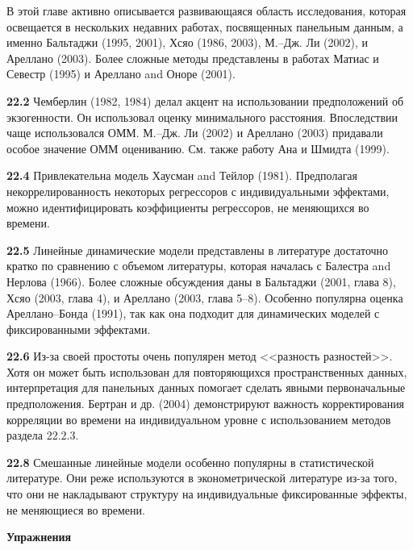 В этой главе активно описывается развивающаяся область исследования, которая освещается в нескольких недавних работах, посвященных панельным данным, а именно Бальтаджи (1995, 2001), Хсяо (1986, 2003), М.–Дж. Ли (2002), и Ареллано (2003). Более сложные методы представлены в работах Матиас и Севестр (1995) и Ареллано and Оноре (2001).

\textbf{22.2} Чемберлин (1982, 1984) делал акцент на использовании предположений об экзогенности. Он использовал оценку минимального расстояния. Впоследствии чаще использовался ОММ. М.–Дж. Ли (2002) и Ареллано (2003) придавали особое значение ОММ оцениванию. См. также работу Ана и Шмидта (1999).

\textbf{22.4} Привлекательна модель Хаусман and Тейлор (1981). Предполагая некоррелированность некоторых регрессоров с индивидуальными эффектами, можно  идентифицировать коэффициенты регрессоров, не меняющихся во времени.

\textbf{22.5} Линейные динамические модели представлены в литературе достаточно кратко по сравнению с объемом литературы, которая началась с Балестра and Нерлова (1966). Более сложные обсуждения даны в Бальтаджи (2001, глава 8), Хсяо (2003, глава 4), и Ареллано (2003, глава 5–8). Особенно популярна оценка Ареллано–Бонда (1991), так как она подходит для динамических моделей с фиксированными эффектами.

\textbf{22.6} Из-за своей простоты очень популярен метод <<разность разностей>>. Хотя он может быть использован для повторяющихся пространственных данных, интерпретация для панельных данных помогает сделать явными первоначальные предположения. Бертран и др. (2004) демонстрируют важность корректирования корреляции во времени на индивидуальном уровне с использованием методов раздела 22.2.3.

\textbf{22.8} Смешанные линейные модели особенно популярны в статистической литературе. Они реже используются в эконометрической литературе из-за того, что они не накладывают структуру на индивидуальные фиксированные эффекты, не меняющиеся во времени.

 {\centering
{\bf Упражнения}\\}

